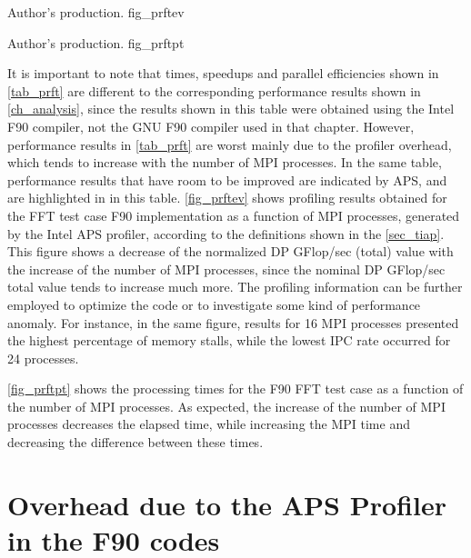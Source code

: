      {Author's production.} {fig_prftev}

     {Author's production.} {fig_prftpt}

It is important to note that times, speedups and parallel efficiencies shown in \autoref {tab_prft} are different to the corresponding performance results shown in \autoref {ch_analysis}, since the results shown in this table were obtained using the Intel F90 compiler, not the GNU F90 compiler used in that chapter. However, performance results in \autoref {tab_prft} are worst mainly due to the profiler overhead, which tends to increase with the number of MPI processes. In the same table, performance results that have room to be improved are indicated by APS, and are highlighted in  in this table. \autoref {fig_prftev} shows profiling results obtained for the FFT test case F90 implementation as a function of MPI processes, generated by the Intel APS profiler, according to the definitions shown in the \autoref {sec_tiap}. This figure shows a decrease of the normalized DP GFlop/sec (total) value with the increase of the number of MPI processes, since the nominal DP GFlop/sec total value tends to increase much more. The profiling information can be further employed to optimize the code or to investigate some kind of performance anomaly. For instance, in the same figure, results for 16 MPI processes presented the highest percentage of memory stalls, while the lowest IPC rate occurred for 24 processes. 

\autoref {fig_prftpt} shows the processing times for the F90 FFT test case as a function of the number of MPI processes. As expected, the increase of the number of MPI processes decreases the elapsed time, while increasing the MPI time and decreasing the difference between these times.

%
%
%
\section{Overhead due to the APS Profiler in the F90 codes}

